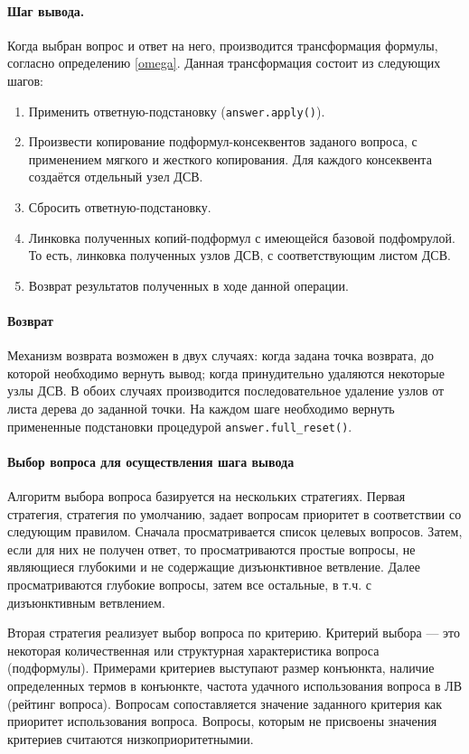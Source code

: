 \paragraph{Шаг вывода.} Когда выбран вопрос и ответ на него, производится трансформация формулы, согласно определению \ref{omega}.
Данная трансформация состоит из следующих шагов:
\begin{enumerate}
\item Применить ответную-подстановку (\texttt{answer.apply()}).
\item Произвести копирование подформул-консеквентов заданого вопроса, с применением мягкого и жесткого копирования. Для каждого консеквента создаётся отдельный узел ДСВ.
\item Сбросить ответную-подстановку.
\item Линковка полученных копий-подформул с имеющейся базовой подфомрулой. То есть, линковка полученных узлов ДСВ, с соответствующим листом ДСВ.
\item Возврат результатов полученных в ходе данной операции.
\end{enumerate}


\paragraph{Возврат}%
Механизм возврата возможен в двух случаях: когда задана точка возврата, до которой необходимо вернуть вывод; когда принудительно удаляются некоторые узлы ДСВ. В обоих случаях производится последовательное удаление узлов от листа дерева до заданной точки. На каждом шаге необходимо вернуть примененные подстановки процедурой \texttt{answer.full\_reset()}.


\paragraph{Выбор вопроса для осуществления шага вывода} %
Алгоритм выбора вопроса базируется на нескольких стратегиях. Первая стратегия, стратегия по умолчанию, задает вопросам приоритет в соответствии со следующим правилом. Сначала просматривается список целевых вопросов. Затем, если для них не получен ответ, то просматриваются простые вопросы, не являющиеся глубокими и не содержащие дизъюнктивное ветвление. Далее просматриваются глубокие вопросы, затем все остальные, в т.ч. с дизъюнктивным ветвлением.

Вторая стратегия реализует выбор вопроса по критерию. Критерий выбора --- это некоторая количественная или структурная характеристика вопроса (подформулы). Примерами критериев выступают размер конъюнкта, наличие определенных термов в конъюнкте, частота удачного использования вопроса в ЛВ (рейтинг вопроса). Вопросам сопоставляется значение заданного критерия как приоритет использования вопроса. Вопросы, которым не присвоены значения критериев считаются низкоприоритетнымии. %

